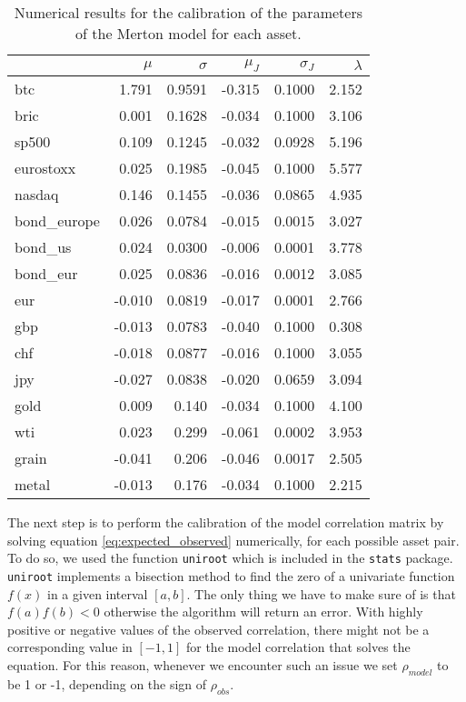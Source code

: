 \begin{table}
	\small
	\centering
	\caption[Merton calibrated parameters]{Numerical results for the calibration of the parameters of the Merton model for each asset.}
	\begin{tabular}{lrrrrr}
		& $\mu$ & $\sigma$ & $\mu_{J}$ & $\sigma_{J}$ & $\lambda$ \\
		\midrule
		btc & 1.791 & 0.9591 & -0.315 & 0.1000 & 2.152 \\
		bric & 0.001 & 0.1628 & -0.034 & 0.1000 & 3.106 \\
		sp500 & 0.109 & 0.1245 & -0.032 & 0.0928 & 5.196 \\
		eurostoxx & 0.025 & 0.1985 & -0.045 & 0.1000 & 5.577 \\
		nasdaq & 0.146 & 0.1455 & -0.036 & 0.0865 & 4.935 \\
		bond\_europe & 0.026 & 0.0784 & -0.015 & 0.0015 & 3.027 \\
		bond\_us & 0.024 & 0.0300 & -0.006 & 0.0001 & 3.778 \\
		bond\_eur & 0.025 & 0.0836 & -0.016 & 0.0012 & 3.085 \\
		eur & -0.010 & 0.0819 & -0.017 & 0.0001 & 2.766 \\
		gbp & -0.013 & 0.0783 & -0.040 & 0.1000 & 0.308 \\
		chf & -0.018 & 0.0877 & -0.016 & 0.1000 & 3.055 \\
		jpy & -0.027 & 0.0838 & -0.020 & 0.0659 & 3.094 \\
		gold & 0.009 & 0.140 & -0.034 & 0.1000 & 4.100 \\
		wti & 0.023 & 0.299 & -0.061 & 0.0002 & 3.953 \\
		grain & -0.041 & 0.206 & -0.046 & 0.0017 & 2.505 \\
		metal & -0.013 & 0.176 & -0.034 & 0.1000 & 2.215 \\
		\midrule
	\end{tabular}
\label{tab:merton_params}
\end{table}

The next step is to perform the calibration of the model correlation matrix by solving equation \eqref{eq:expected_observed} numerically, for each possible asset pair.
To do so, we used the function \texttt{uniroot} which is included in the \texttt{stats} package. \texttt{uniroot} implements a bisection method to find the zero of a univariate function $f(x)$ in a given interval $[a,b]$. The only thing we have to make sure of is that $f(a)f(b)< 0 $ otherwise the algorithm will return an error.
With highly positive or negative values of the observed correlation, there might not be a corresponding value in $[-1,1]$ for the model correlation that solves the equation. For this reason, whenever we encounter such an issue we set $\rho_{model}$ to be 1 or -1, depending on the sign of $\rho_{obs}$.

